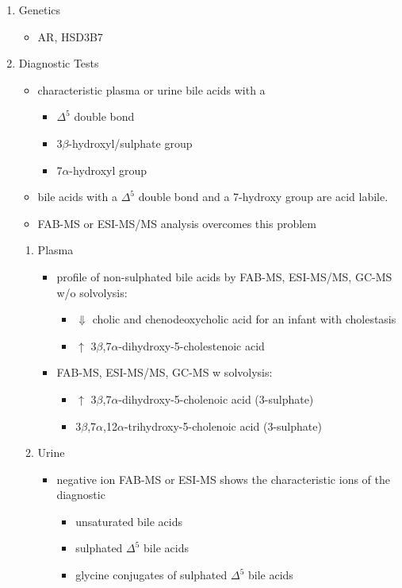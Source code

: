 \documentclass{scrartcl}
\begin{document}
\begin{enumerate}
\item Genetics
\label{sec:orgecd75df}
\begin{itemize}
\item AR, HSD3B7
\end{itemize}

\item Diagnostic Tests
\label{sec:orged3f670}
\begin{itemize}
\item characteristic plasma or urine bile acids with a
\begin{itemize}
\item \(\Delta^{\text{5}}\) double bond
\item 3\(\beta\)-hydroxyl/sulphate group
\item 7\(\alpha\)-hydroxyl group
\end{itemize}
\item bile acids with a \(\Delta^{\text{5}}\) double bond and a 7-hydroxy group are acid labile.
\item FAB-MS or ESI-MS/MS analysis overcomes this problem
\end{itemize}

\begin{enumerate}
\item Plasma
\label{sec:orgd5741e4}
\begin{itemize}
\item profile of non-sulphated bile acids by FAB-MS, ESI-MS/MS, GC-MS w/o solvolysis:
\begin{itemize}
\item \(\Downarrow\) cholic and chenodeoxycholic acid for an infant with cholestasis
\item \(\uparrow\) 3\(\beta\),7\(\alpha\)-dihydroxy-5-cholestenoic acid
\end{itemize}
\item FAB-MS, ESI-MS/MS, GC-MS w solvolysis:
\begin{itemize}
\item \(\uparrow\) 3\(\beta\),7\(\alpha\)-dihydroxy-5-cholenoic acid (3-sulphate)
\item 3\(\beta\),7\(\alpha\),12\(\alpha\)-trihydroxy-5-cholenoic acid (3-sulphate)
\end{itemize}
\end{itemize}

\item Urine
\label{sec:orge52d0f1}
\begin{itemize}
\item negative ion FAB-MS or ESI-MS shows the characteristic ions of the
diagnostic
\begin{itemize}
\item unsaturated bile acids
\item sulphated \(\Delta^{\text{5}}\) bile acids
\item glycine conjugates of sulphated \(\Delta^{\text{5}}\) bile acids
\end{itemize}
\end{itemize}


\end{enumerate}
\end{enumerate}
\end{document}
